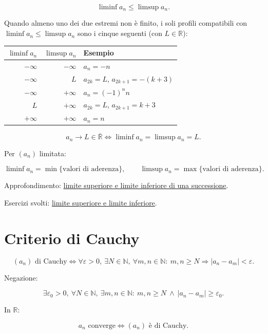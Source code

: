 \[
\liminf a_n\le\limsup a_n.
\]

Quando almeno uno dei due estremi non è finito, i soli profili compatibili con \(\liminf a_n\le\limsup a_n\) sono i cinque seguenti (con \(L\in\mathbb R\)):

\begin{longtable}[]{@{}rrl@{}}
\toprule\noalign{}
\(\liminf a_n\) & \(\limsup a_n\) & Esempio \\
\midrule\noalign{}
\endhead
\bottomrule\noalign{}
\endlastfoot
\(-\infty\) & \(-\infty\) & \(a_n=-n\) \\
\(-\infty\) & \(L\) & \(a_{2k}=L\), \(a_{2k+1}=-(k+3)\) \\
\(-\infty\) & \(+\infty\) & \(a_n=(-1)^n n\) \\
\(L\) & \(+\infty\) & \(a_{2k}=L\), \(a_{2k+1}=k+3\) \\
\(+\infty\) & \(+\infty\) & \(a_n=n\) \\
\end{longtable}

\[
a_n\to L\in\overline{\mathbb R}
\Longleftrightarrow
\liminf a_n=\limsup a_n=L.
\]

Per \((a_n)\) limitata:

\[
\liminf a_n=\min\{\text{valori di aderenza}\},
\qquad
\limsup a_n=\max\{\text{valori di aderenza}\}.
\]

Approfondimento: \href{https://ingegnerismo.it/matematica/limite-superiore-e-limite-inferiore-di-una-successione/}{limite superiore e limite inferiore di una successione}.

Esercizi svolti: \href{https://ingegnerismo.it/matematica/limsup-liminf-successioni-esercizi/}{limite superiore e limite inferiore}.

\section{Criterio di Cauchy}\label{criterio-di-cauchy}

\[
(a_n)\text{ di Cauchy}
\Longleftrightarrow
\forall\varepsilon>0,\ \exists N\in\mathbb{N},\ \forall m,n\in\mathbb N:\
m,n\ge N\Longrightarrow |a_n-a_m|<\varepsilon.
\]

Negazione:

\[
\exists\varepsilon_0>0,\ \forall N\in\mathbb N,\ \exists m,n\in\mathbb N:\
m,n\ge N\ \land\ |a_n-a_m|\ge\varepsilon_0.
\]

In \(\mathbb R\):

\[
a_n\text{ converge}
\Longleftrightarrow
(a_n)\text{ è di Cauchy}.
\]


